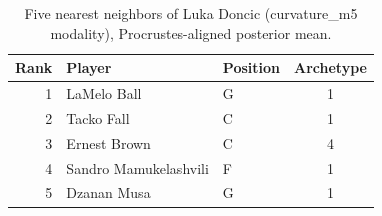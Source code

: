 \begin{table}[htbp]
  \centering\small
  \begin{tabular}{rllc}
    \toprule
    Rank & Player & Position & Archetype \\
    \midrule
    1 & LaMelo Ball & G & 1 \\
    2 & Tacko Fall & C & 1 \\
    3 & Ernest Brown & C & 4 \\
    4 & Sandro Mamukelashvili & F & 1 \\
    5 & Dzanan Musa & G & 1 \\
    \bottomrule
  \end{tabular}
  \caption{Five nearest neighbors of Luka Doncic (curvature_m5 modality), Procrustes-aligned posterior mean.}
  \label{tab:Luka_Doncic_neighbors_curvature_m5}
\end{table}


